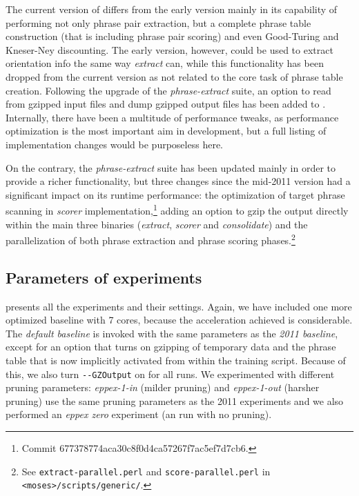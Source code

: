 The current version of \eppex{} differs from the early version mainly in its
capability of performing not only phrase pair extraction, but a complete
phrase table construction (that is including phrase pair scoring) and even
Good-Turing and Kneser-Ney discounting.
The early version, however, could be used to extract orientation info
the same way \emph{extract} can, while this functionality has been dropped
from the current version as not related to the core task of phrase table creation.
Following the upgrade of the \emph{phrase-extract} suite, an option to read from
gzipped input files and dump gzipped output files has been added to \eppex{}.
Internally, there have been a multitude of performance tweaks,
as performance optimization is the most important aim in \eppex{} development,
but a full listing of implementation changes would be purposeless here.

On the contrary, the \emph{phrase-extract} suite has been updated mainly in order to
provide a richer functionality, but three changes since the mid-2011 version
had a significant impact on its runtime performance: the optimization of target phrase
scanning in \emph{scorer} implementation,\footnote{Commit 677378774aca30c8f0d4ca57267f7ac5ef7d7cb6.}
adding an option to gzip the output directly within the main three binaries
(\emph{extract}, \emph{scorer} and \emph{consolidate})
and the parallelization of both phrase extraction and phrase scoring
phases.\footnote{See \texttt{extract-parallel.perl} and \texttt{score-parallel.perl}
in \texttt{<moses>/scripts/generic/}.}

\subsection{Parameters of experiments}

 presents all the experiments and their settings.
Again, we have included one more optimized baseline with 7 cores, because
the acceleration achieved is considerable.
The \emph{default baseline} is invoked with the same parameters as the \emph{2011
baseline}, except for an option that turns on gzipping of temporary data and
the phrase table that is now implicitly activated from within the training script.
Because of this, we also turn \verb|--GZOutput| on for all \eppex{} runs.
We experimented with different pruning parameters: \emph{eppex-1-in} (milder
pruning) and \emph{eppex-1-out} (harsher pruning) use the same pruning
parameters as the 2011 experiments and we also performed an \emph{eppex zero}
experiment (an \eppex{} run with no pruning).

